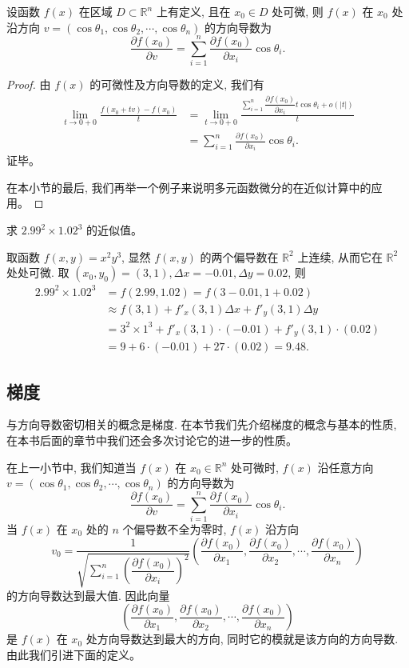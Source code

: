 \documentclass[12pt,fontset=fandol]{ctexart}
\begin{document}
\begin{theorem}\label{course-theorem-14-1-3}\quad 设函数 $f(x)$ 在区域 $D\subset\mathbb R^n$ 上有定义, 且在 $x_0\in D$ 处可微, 则 $f(x)$ 在 $x_0$ 处沿方向 $v=(\cos\theta_1,\cos\theta_2,\cdots,\cos\theta_n)$ 的方向导数为
\[
  \frac{\partial f(x_0)}{\partial v}
  =\sum_{i=1}^n\frac{\partial f(x_0)}{\partial x_i}\cos\theta_i.
\]

\end{theorem}
\begin{proof}\quad 由 $f(x)$ 的可微性及方向导数的定义, 我们有
\[
\begin{aligned}
  \lim_{t\to0+0}\frac{f(x_0+tv)-f(x_0)}{t}
  &=\lim_{t\to0+0}
  \frac{\sum\limits_{i=1}^n\dfrac{\partial f(x_0)}{\partial x_i}t\cos\theta_i+o(|t|)}{t}\\
  &=\sum_{i=1}^n\frac{\partial f(x_0)}{\partial x_i}\cos\theta_i.
\end{aligned}
\]
证毕。

在本小节的最后, 我们再举一个例子来说明多元函数微分的在近似计算中的应用。

\end{proof}
\begin{example}\label{course-example-14-1-6}\quad 求 $2.99^2\times1.02^3$ 的近似值。

\end{example}
\begin{solve}\quad 取函数 $f(x,y)=x^2y^3$, 显然 $f(x,y)$ 的两个偏导数在 $\mathbb R^2$ 上连续, 从而它在 $\mathbb R^2$ 处处可微. 取 $(x_0,y_0)=(3,1), \Delta x=-0.01, \Delta y=0.02$, 则
\[
\begin{aligned}
  2.99^2\times1.02^3
  &=f(2.99,1.02)=f(3-0.01,1+0.02)\\
  &\approx f(3,1)+f'_x(3,1)\Delta x+f'_y(3,1)\Delta y\\
  &=3^2\times1^3+f'_x(3,1)\cdot(-0.01)+f'_y(3,1)\cdot(0.02)\\
  &=9+6\cdot(-0.01)+27\cdot(0.02)=9.48.
\end{aligned}
\]

\end{solve}
\subsection{梯度}

与方向导数密切相关的概念是梯度. 在本节我们先介绍梯度的概念与基本的性质, 在本书后面的章节中我们还会多次讨论它的进一步的性质。

在上一小节中, 我们知道当 $f(x)$ 在 $x_0\in\mathbb R^n$ 处可微时, $f(x)$ 沿任意方向 $v=(\cos\theta_1,\cos\theta_2,\cdots,\cos\theta_n)$ 的方向导数为
\[
  \frac{\partial f(x_0)}{\partial v}=
  \sum_{i=1}^n\frac{\partial f(x_0)}{\partial x_i}\cos\theta_i.
\]
当 $f(x)$ 在 $x_0$ 处的 $n$ 个偏导数不全为零时, $f(x)$ 沿方向
\[
  v_0=
  \frac1{\sqrt{\sum\limits_{i=1}^n\left(\dfrac{\partial f(x_0)}{\partial x_i}\right)^2}}
  \left(\frac{\partial f(x_0)}{\partial x_1},\frac{\partial f(x_0)}{\partial x_2},\cdots,\frac{\partial f(x_0)}{\partial x_n}\right)
\]
的方向导数达到最大值. 因此向量
\[
  \left(\frac{\partial f(x_0)}{\partial x_1},\frac{\partial f(x_0)}{\partial x_2},\cdots,\frac{\partial f(x_0)}{\partial x_n}\right)
\]
是 $f(x)$ 在 $x_0$ 处方向导数达到最大的方向, 同时它的模就是该方向的方向导数. 由此我们引进下面的定义。
\end{document}
